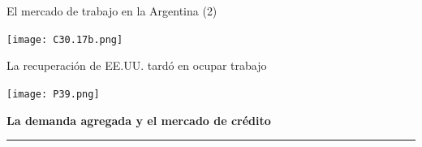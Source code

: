 \documentclass{beamer}
\begin{document}

\begin{frame}{El mercado de trabajo en la Argentina (2)}

\centering\texttt{[image: C30.17b.png]}\

\end{frame}






\begin{frame}{La recuperación de EE.UU. tardó en ocupar trabajo}

\centering\texttt{[image: P39.png]}\

\end{frame}











\begin{frame}{}
\centering 	\huge \textbf{La demanda agregada y el mercado de crédito} 
\vspace{2mm}
\hrule
\end{frame}
\end{document}
